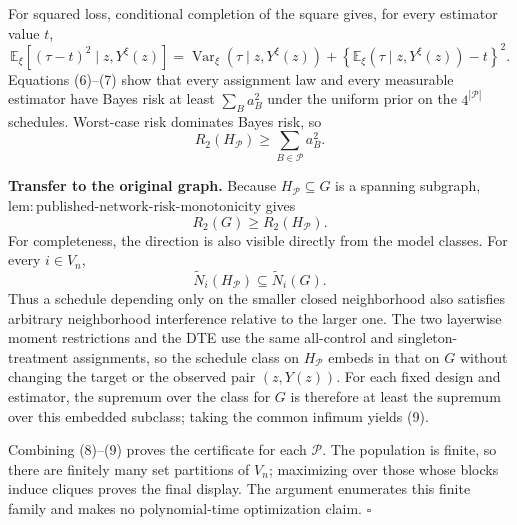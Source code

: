 For squared loss, conditional completion of the square gives, for every estimator value \(t\),
\[
\mathbb E_{\xi}\!\left[(\tau-t)^2\mid z,Y^{\xi}(z)\right]
=\operatorname{Var}_{\xi}(\tau\mid z,Y^{\xi}(z))
+\left\{\mathbb E_{\xi}(\tau\mid z,Y^{\xi}(z))-t\right\}^2.
\tag{7}
\]
Equations (6)--(7) show that every assignment law and every measurable estimator have Bayes risk at least \(\sum_Ba_B^2\) under the uniform prior on the \(4^{|\mathcal P|}\) schedules. Worst-case risk dominates Bayes risk, so
\[
R_2(H_{\mathcal P})\geq\sum_{B\in\mathcal P}a_B^2.
\tag{8}
\]

\textbf{Transfer to the original graph.}
Because \(H_{\mathcal P}\subseteq G\) is a spanning subgraph, \(\mathrm{lem{:}published\text{-}network\text{-}risk\text{-}monotonicity}\) gives
\[
R_2(G)\geq R_2(H_{\mathcal P}).
\tag{9}
\]
For completeness, the direction is also visible directly from the model classes. For every \(i\in V_n\),
\[
\widetilde N_i(H_{\mathcal P})\subseteq\widetilde N_i(G).
\tag{10}
\]
Thus a schedule depending only on the smaller closed neighborhood also satisfies arbitrary neighborhood interference relative to the larger one. The two layerwise moment restrictions and the DTE use the same all-control and singleton-treatment assignments, so the schedule class on \(H_{\mathcal P}\) embeds in that on \(G\) without changing the target or the observed pair \((z,Y(z))\). For each fixed design and estimator, the supremum over the class for \(G\) is therefore at least the supremum over this embedded subclass; taking the common infimum yields (9).

Combining (8)--(9) proves the certificate for each \(\mathcal P\). The population is finite, so there are finitely many set partitions of \(V_n\); maximizing over those whose blocks induce cliques proves the final display. The argument enumerates this finite family and makes no polynomial-time optimization claim. \(\square\)
